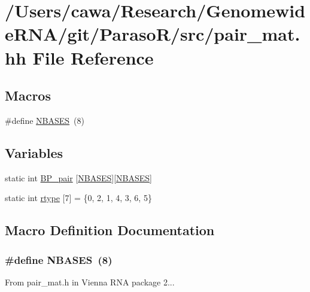 \hypertarget{pair__mat_8hh}{\section{/\+Users/cawa/\+Research/\+Genomewide\+R\+N\+A/git/\+Paraso\+R/src/pair\+\_\+mat.hh File Reference}
\label{pair__mat_8hh}
}
\subsection*{Macros}
\begin{DoxyCompactItemize}
\item 
\#define \hyperlink{pair__mat_8hh_ad554b4852cd5fec35025db8edbbba3cd}{N\+B\+A\+S\+E\+S}~(8)
\end{DoxyCompactItemize}
\subsection*{Variables}
\begin{DoxyCompactItemize}
\item 
static int \hyperlink{pair__mat_8hh_a4d0b503b0d6831ff671757e5b196ed14}{B\+P\+\_\+pair} \mbox{[}\hyperlink{pair__mat_8hh_ad554b4852cd5fec35025db8edbbba3cd}{N\+B\+A\+S\+E\+S}\mbox{]}\mbox{[}\hyperlink{pair__mat_8hh_ad554b4852cd5fec35025db8edbbba3cd}{N\+B\+A\+S\+E\+S}\mbox{]}
\item 
static int \hyperlink{pair__mat_8hh_a0c7d147d8a3269289b4d69479e7f8fa6}{rtype} \mbox{[}7\mbox{]} = \{0, 2, 1, 4, 3, 6, 5\}
\end{DoxyCompactItemize}


\subsection{Macro Definition Documentation}
\hypertarget{pair__mat_8hh_ad554b4852cd5fec35025db8edbbba3cd}{
\subsubsection[{N\+B\+A\+S\+E\+S}]{\setlength{\rightskip}{0pt plus 5cm}\#define N\+B\+A\+S\+E\+S~(8)}}\label{pair__mat_8hh_ad554b4852cd5fec35025db8edbbba3cd}
From pair\+\_\+mat.\+h in Vienna R\+N\+A package 2... 

